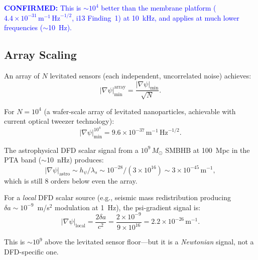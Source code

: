 \documentclass[11pt]{article}
\theoremstyle{definition}
\theoremstyle{remark}
\newcommand{\ee}[1]{\times10^{#1}}
\newcommand{\sqrtHz}{\,\mathrm{Hz}^{-1/2}}
\newcommand{\Msun}{M_\odot}
\newcommand{\confirmed}[1]{\textcolor{blue}{\textbf{CONFIRMED:} #1}}
\begin{document}
\confirmed{This is $\sim 10^4$ better than the membrane platform
($4.4\ee{-31}\,\mathrm{m}^{-1}\sqrtHz$, i13 Finding~1) at
10~kHz, and applies at much lower frequencies ($\sim$10~Hz).}

\subsection{Array Scaling}

An array of $N$ levitated sensors (each independent, uncorrelated
noise) achieves:
\begin{equation}
|\nabla\psi|_{\min}^{\mathrm{array}} = \frac{|\nabla\psi|_{\min}}{\sqrt{N}}.
\end{equation}

For $N = 10^4$ (a wafer-scale array of levitated nanoparticles,
achievable with current optical tweezer technology):
\begin{equation}
|\nabla\psi|_{\min}^{10^4} = 9.6\ee{-37}\,\mathrm{m}^{-1}\sqrtHz.
\end{equation}

The astrophysical DFD scalar signal from a $10^9\,\Msun$ SMBHB
at 100~Mpc in the PTA band ($\sim$10~nHz) produces:
\begin{equation}
|\nabla\psi|_{\mathrm{astro}} \sim h_\psi / \lambda_s
\sim 10^{-28} / (3\ee{16}) \sim 3\ee{-45}\,\mathrm{m}^{-1},
\end{equation}
which is still 8 orders below even the array.

For a \emph{local} DFD scalar source (e.g., seismic mass
redistribution producing $\delta a \sim 10^{-9}$~m/s$^2$
modulation at 1~Hz), the psi-gradient signal is:
\begin{equation}
|\nabla\psi|_{\mathrm{local}} = \frac{2 \delta a}{c^2}
= \frac{2\ee{-9}}{9\ee{16}} = 2.2\ee{-26}\,\mathrm{m}^{-1}.
\end{equation}

This is $\sim 10^9$ above the levitated sensor floor---but it is
a \emph{Newtonian} signal, not a DFD-specific one.
\end{document}
